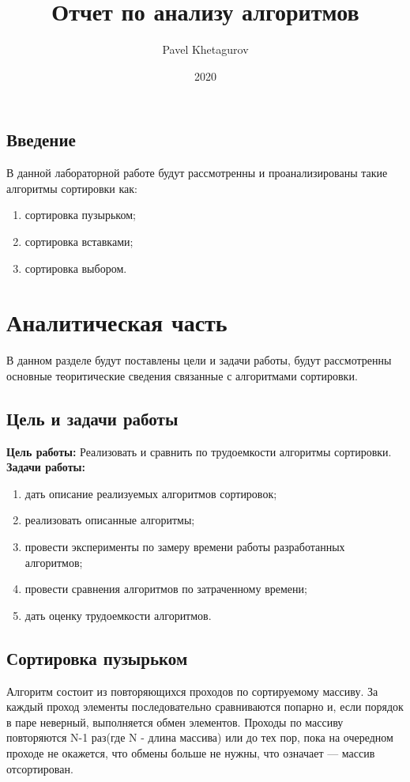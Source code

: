 \documentclass{article}
\title{Отчет по анализу алгоритмов}
\date{2020}
\author{Pavel Khetagurov}
\begin{document}
	
	\newpage
	\tableofcontents
	\newpage
	\begin{center}
	    \section*{Введение}
	\end{center}
		В данной лабораторной работе будут рассмотренны и проанализированы такие алгоритмы сортировки как:
		\begin{enumerate}
		\item сортировка пузырьком;
		\item сортировка вставками;
		\item сортировка выбором.
		\end{enumerate}
	\newpage
	\section{Аналитическая часть}
	В данном разделе будут поставлены цели и задачи работы, будут рассмотренны основные теоритические сведения связанные с алгоритмами сортировки.
		\subsection{Цель и задачи работы}
			\textbf{Цель работы:}
			\newline
			Реализовать и сравнить по трудоемкости алгоритмы сортировки.
			\newline 
			\indent \textbf{Задачи работы:}
			\begin{enumerate}
				\item дать описание реализуемых алгоритмов сортировок;
				\item реализовать описанные алгоритмы;
				\item провести эксперименты по замеру времени работы разработанных алгоритмов;
				\item провести сравнения алгоритмов по затраченному времени;
				\item дать оценку трудоемкости алгоритмов.
			\end{enumerate}
		\subsection{Сортировка пузырьком}
		Алгоритм состоит из повторяющихся проходов по сортируемому массиву. За каждый проход элементы 
		последовательно сравниваются попарно и, если порядок в паре неверный, выполняется обмен 
		элементов. Проходы по массиву повторяются N-1 раз(где N - длина массива) или до тех пор, пока на 
		очередном проходе не окажется, что обмены больше не нужны, что означает — массив отсортирован.\cite{baseSort}
\newline
\end{document}
